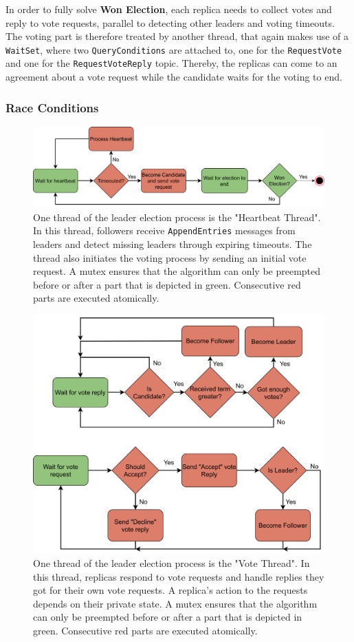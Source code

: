 In order to fully solve \textbf{Won Election}, each replica needs to collect votes and reply to vote requests, parallel to detecting other leaders and voting timeouts.
The voting part is therefore treated by another  thread, that again makes use of a \texttt{WaitSet}, where two \texttt{QueryConditions} are attached to, one for the \texttt{RequestVote} and one for the \texttt{RequestVoteReply} topic.
Thereby, the replicas can come to an agreement about a vote request while the candidate waits for the voting to end.

\subsubsection{Race Conditions}
\label{subsub:raceConditions}
\begin{figure}[!hb]
	\centering
	\includegraphics[width=0.75\linewidth]{images/LeaderElectionHeartbeatThread}
	\caption{One  thread of the leader election process is the "Heartbeat Thread". In this thread, followers receive \texttt{AppendEntries} messages from leaders and detect missing leaders through expiring timeouts. The thread also initiates the voting process by sending an initial vote request. A mutex ensures that the algorithm can only be preempted before or after a part that is depicted in green. Consecutive red parts are executed atomically.}
	\label{fig:LeaderElectionHeartbeatThread}
\end{figure}

\begin{figure}[!hb]
	\centering
	\includegraphics[width=0.75\linewidth]{images/LeaderElectionVoteThread}
	\caption{One  thread of the leader election process is the "Vote Thread". In this thread, replicas respond to vote requests and handle replies they got for their own vote requests. A replica's action to the requests depends on their private state. A mutex ensures that the algorithm can only be preempted before or after a part that is depicted in green. Consecutive red parts are executed atomically.}
	\label{fig:LeaderElectionVoteThread}
\end{figure}

